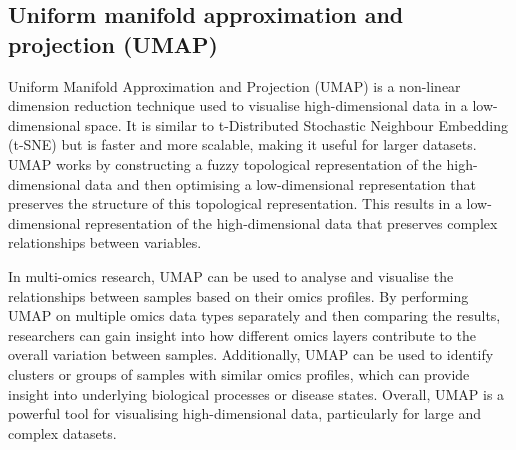 \documentclass[
]{book}
\newenvironment{Shaded}{\begin{snugshade}}{\end{snugshade}}
\newcommand{\AttributeTok}[1]{\textcolor[rgb]{0.77,0.63,0.00}{#1}}
\newcommand{\CommentTok}[1]{\textcolor[rgb]{0.56,0.35,0.01}{\textit{#1}}}
\newcommand{\DecValTok}[1]{\textcolor[rgb]{0.00,0.00,0.81}{#1}}
\newcommand{\FunctionTok}[1]{\textcolor[rgb]{0.00,0.00,0.00}{#1}}
\newcommand{\NormalTok}[1]{#1}
\newcommand{\OtherTok}[1]{\textcolor[rgb]{0.56,0.35,0.01}{#1}}
\newcommand{\SpecialCharTok}[1]{\textcolor[rgb]{0.00,0.00,0.00}{#1}}
\newcommand{\StringTok}[1]{\textcolor[rgb]{0.31,0.60,0.02}{#1}}
\begin{document}
\normalsize

\hypertarget{umap}{%
\subsection{Uniform manifold approximation and projection (UMAP)}\label{umap}}

Uniform Manifold Approximation and Projection (UMAP) is a non-linear dimension reduction technique used to visualise high-dimensional data in a low-dimensional space. It is similar to t-Distributed Stochastic Neighbour Embedding (t-SNE) but is faster and more scalable, making it useful for larger datasets. UMAP works by constructing a fuzzy topological representation of the high-dimensional data and then optimising a low-dimensional representation that preserves the structure of this topological representation. This results in a low-dimensional representation of the high-dimensional data that preserves complex relationships between variables.

In multi-omics research, UMAP can be used to analyse and visualise the relationships between samples based on their omics profiles. By performing UMAP on multiple omics data types separately and then comparing the results, researchers can gain insight into how different omics layers contribute to the overall variation between samples. Additionally, UMAP can be used to identify clusters or groups of samples with similar omics profiles, which can provide insight into underlying biological processes or disease states. Overall, UMAP is a powerful tool for visualising high-dimensional data, particularly for large and complex datasets.

\small

\begin{Shaded}
\end{Shaded}
\end{document}
